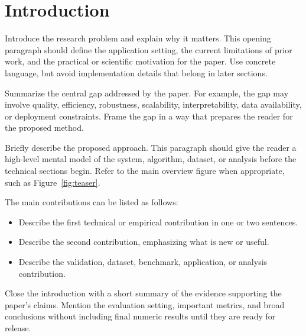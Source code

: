 \section{Introduction}

Introduce the research problem and explain why it matters.
This opening paragraph should define the application setting, the current limitations of prior work, and the practical or scientific motivation for the paper.
Use concrete language, but avoid implementation details that belong in later sections.

Summarize the central gap addressed by the paper.
For example, the gap may involve quality, efficiency, robustness, scalability, interpretability, data availability, or deployment constraints.
Frame the gap in a way that prepares the reader for the proposed method.

Briefly describe the proposed approach.
This paragraph should give the reader a high-level mental model of the system, algorithm, dataset, or analysis before the technical sections begin.
Refer to the main overview figure when appropriate, such as Figure~\ref{fig:teaser}.

The main contributions can be listed as follows:
\begin{itemize}
    \item {} Describe the first technical or empirical contribution in one or two sentences.
    \item {} Describe the second contribution, emphasizing what is new or useful.
    \item {} Describe the validation, dataset, benchmark, application, or analysis contribution.
\end{itemize}

Close the introduction with a short summary of the evidence supporting the paper's claims.
Mention the evaluation setting, important metrics, and broad conclusions without including final numeric results until they are ready for release.

\newpage
